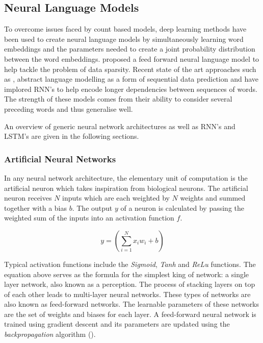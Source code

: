 \subsection{Neural Language Models}
To overcome issues faced by count based models, deep learning methods have been used to create neural language models by simultaneously learning word embeddings and the parameters needed to create a joint probability distribution between the word embeddings. \cite{Bengio2003} proposed a feed forward neural language model to help tackle the problem of data sparsity. Recent state of the art approaches such as \cite{Mikolov2010}, abstract language modelling as a form of sequential data prediction and have implored RNN's to help encode longer dependencies between sequences of words. The strength of these models comes from their ability to consider several preceding words and thus generalise well.

\noindent
\newline
An overview of generic neural network architectures as well as RNN's and LSTM's are given in the following sections.

\noindent
\newline
\newline
\subsubsection{Artificial Neural Networks}
In any neural network architecture, the elementary unit of computation is the artificial neuron which takes inspiration from biological neurons. The artificial neuron receives \(N\) inputs which are each weighted by \(N\) weights and summed together with a bias \(b\). The output \(y\) of a neuron is calculated by passing the weighted sum of the inputs into an activation function \(f\). 

\begin{equation}
	y = \left( \sum_{i=1}^{N} x_{i}w_{i} + b\right)
\end{equation}

\noindent
\newline
Typical activation functions include the \textit{Sigmoid}, \textit{Tanh} and \textit{ReLu} functions. The equation above serves as the formula for the simplest king of network: a single layer network, also known as a perception. The process of stacking layers on top of each other leads to multi-layer neural networks. These types of networks are also known as feed-forward networks. The learnable parameters of these networks are the set of weights and biases for each layer. A feed-forward neural network is trained using gradient descent and its parameters are updated using the \textit{backpropagation} algorithm (\cite{Rumelhart1988}).


